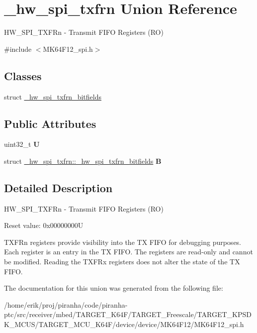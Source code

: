 \hypertarget{union__hw__spi__txfrn}{}\section{\+\_\+hw\+\_\+spi\+\_\+txfrn Union Reference}
\label{union__hw__spi__txfrn}


H\+W\+\_\+\+S\+P\+I\+\_\+\+T\+X\+F\+Rn -\/ Transmit F\+I\+FO Registers (RO)  




{\ttfamily \#include $<$M\+K64\+F12\+\_\+spi.\+h$>$}

\subsection*{Classes}
\begin{DoxyCompactItemize}
\item 
struct \hyperlink{struct__hw__spi__txfrn_1_1__hw__spi__txfrn__bitfields}{\+\_\+hw\+\_\+spi\+\_\+txfrn\+\_\+bitfields}
\end{DoxyCompactItemize}
\subsection*{Public Attributes}
\begin{DoxyCompactItemize}
\item 
uint32\+\_\+t {\bfseries U}\hypertarget{union__hw__spi__txfrn_a30da69fb5c253ca3ad60d8e7960ee8cb}{}\label{union__hw__spi__txfrn_a30da69fb5c253ca3ad60d8e7960ee8cb}

\item 
struct \hyperlink{struct__hw__spi__txfrn_1_1__hw__spi__txfrn__bitfields}{\+\_\+hw\+\_\+spi\+\_\+txfrn\+::\+\_\+hw\+\_\+spi\+\_\+txfrn\+\_\+bitfields} {\bfseries B}\hypertarget{union__hw__spi__txfrn_a3792f7d953fcefa79664a284806d40a7}{}\label{union__hw__spi__txfrn_a3792f7d953fcefa79664a284806d40a7}

\end{DoxyCompactItemize}


\subsection{Detailed Description}
H\+W\+\_\+\+S\+P\+I\+\_\+\+T\+X\+F\+Rn -\/ Transmit F\+I\+FO Registers (RO) 

Reset value\+: 0x00000000U

T\+X\+F\+Rn registers provide visibility into the TX F\+I\+FO for debugging purposes. Each register is an entry in the TX F\+I\+FO. The registers are read-\/only and cannot be modified. Reading the T\+X\+F\+Rx registers does not alter the state of the TX F\+I\+FO. 

The documentation for this union was generated from the following file\+:\begin{DoxyCompactItemize}
\item 
/home/erik/proj/piranha/code/piranha-\/ptc/src/receiver/mbed/\+T\+A\+R\+G\+E\+T\+\_\+\+K64\+F/\+T\+A\+R\+G\+E\+T\+\_\+\+Freescale/\+T\+A\+R\+G\+E\+T\+\_\+\+K\+P\+S\+D\+K\+\_\+\+M\+C\+U\+S/\+T\+A\+R\+G\+E\+T\+\_\+\+M\+C\+U\+\_\+\+K64\+F/device/device/\+M\+K64\+F12/M\+K64\+F12\+\_\+spi.\+h\end{DoxyCompactItemize}
